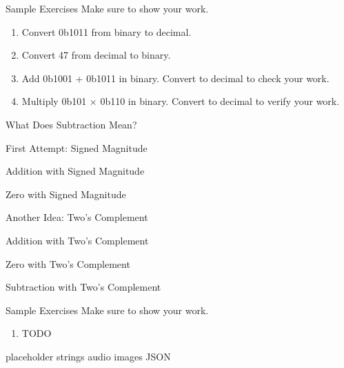 \begin{frame}{Sample Exercises}
Make sure to show your work.
\vfill 
\begin{enumerate}
    \item Convert 0b1011 from binary to decimal. 
    \vfill
    \item Convert 47 from decimal to binary.
    \vfill
    \item Add 0b1001 + 0b1011 in binary. Convert to decimal to check your work.
    \vfill
    \item Multiply 0b101 $\times$ 0b110 in binary. Convert to decimal to verify your work.
    \vfill 
\end{enumerate}
\end{frame}


\begin{frame}{What Does Subtraction Mean?}
\end{frame}

\begin{frame}{First Attempt: Signed Magnitude}
\end{frame}

\begin{frame}{Addition with Signed Magnitude}
\end{frame}

\begin{frame}{Zero with Signed Magnitude}
\end{frame}

\begin{frame}{Another Idea: Two's Complement}
\end{frame}

\begin{frame}{Addition with Two's Complement}
\end{frame}

\begin{frame}{Zero with Two's Complement}
\end{frame}

\begin{frame}{Subtraction with Two's Complement}
\end{frame}

\begin{frame}{Sample Exercises}
Make sure to show your work.
\vfill 
\begin{enumerate}
    \item TODO
    \vfill 
\end{enumerate}
\end{frame}




\begin{frame}{placeholder}
    strings
    audio
    images
    JSON
\end{frame}
    
